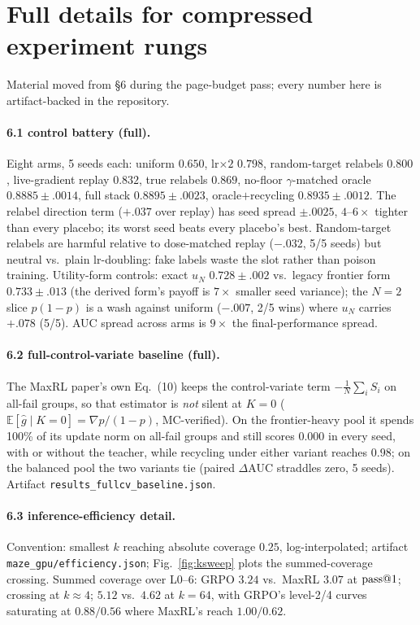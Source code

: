 \section{Full details for compressed experiment rungs}\label{app:rungs}

Material moved from \S 6 during the page-budget pass; every number here
is artifact-backed in the repository.

\paragraph{6.1 control battery (full).} Eight arms, 5 seeds each:
uniform $0.650$, lr$\times 2$ $0.798$, random-target relabels $0.800$,
live-gradient replay $0.832$, true relabels $0.869$, no-floor
$\gamma$-matched oracle $0.8885{\pm}.0014$, full stack
$0.8895{\pm}.0023$, oracle$+$recycling $0.8935{\pm}.0012$. The relabel
direction term ($+.037$ over replay) has seed spread $\pm.0025$,
$4$--$6\times$ tighter than every placebo; its worst seed beats every
placebo's best. Random-target relabels are harmful relative to
dose-matched replay ($-.032$, 5/5 seeds) but neutral vs.\ plain
lr-doubling: fake labels waste the slot rather than poison training.
Utility-form controls: exact $u_N$ $0.728{\pm}.002$ vs.\ legacy
frontier form $0.733{\pm}.013$ (the derived form's payoff is $7\times$
smaller seed variance); the $N{=}2$ slice $p(1{-}p)$ is a wash against
uniform ($-.007$, 2/5 wins) where $u_N$ carries $+.078$ (5/5). AUC
spread across arms is $9\times$ the final-performance spread.

\paragraph{6.2 full-control-variate baseline (full).} The MaxRL
paper's own Eq.~(10) keeps the control-variate term
$-\frac1N\sum_i S_i$ on all-fail groups, so that estimator is
\emph{not} silent at $K{=}0$
($\mathbb{E}[\hat g \mid K{=}0] = \nabla p/(1-p)$, MC-verified). On
the frontier-heavy pool it spends 100\% of its update norm on
all-fail groups and still scores $0.000$ in every seed, with or
without the teacher, while recycling under either variant reaches
$0.98$; on the balanced pool the two variants tie (paired
$\Delta$AUC straddles zero, 5 seeds). Artifact
\texttt{results\_fullcv\_baseline.json}.

\paragraph{6.3 inference-efficiency detail.} Convention: smallest $k$
reaching absolute coverage $0.25$, log-interpolated; artifact
\texttt{maze\_gpu/efficiency.json}; Fig.~\ref{fig:ksweep} plots the
summed-coverage crossing. Summed coverage over L0--6: GRPO
$3.24$ vs.\ MaxRL $3.07$ at $\text{pass@}1$; crossing at $k{\approx}4$;
$5.12$ vs.\ $4.62$ at $k{=}64$, with GRPO's level-2/4 curves saturating
at $0.88/0.56$ where MaxRL's reach $1.00/0.62$.

